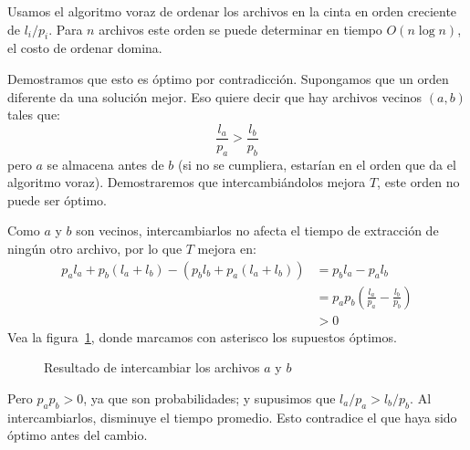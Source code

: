   Usamos el algoritmo voraz de ordenar los archivos en la cinta
  en orden creciente de \(l_i / p_i\).
  Para \(n\) archivos
  este orden se puede determinar en tiempo \(O(n \log n)\),
  el costo de ordenar domina.

  Demostramos que esto es óptimo por contradicción.
  Supongamos que un orden diferente da una solución mejor.
  Eso quiere decir que hay archivos vecinos \((a, b)\)
  tales que:
  \begin{equation*}
    \frac{l_a}{p_a}
      > \frac{l_b}{p_b}
  \end{equation*}
  pero \(a\) se almacena antes de \(b\)
  (si no se cumpliera,
   estarían en el orden que da el algoritmo voraz).
  Demostraremos que intercambiándolos mejora \(T\),
  este orden no puede ser óptimo.

  Como \(a\) y \(b\) son vecinos,
  intercambiarlos no afecta el tiempo de extracción de ningún otro archivo,
  por lo que \(T\) mejora en:
  \begin{align*}
    p_a l_a + p_b (l_a + l_b)
      - (p_b l_b + p_a (l_a + l_b))
      &= p_b l_a - p_a l_b \\
      &= p_a p_b \left( \frac{l_a}{p_a} - \frac{l_b}{p_b} \right) \\
      &> 0
  \end{align*}
  Vea la figura~\ref{fig:file-reordering},
  donde marcamos con asterisco los supuestos óptimos.
  \begin{figure}[ht]
    \centering
    \caption{Resultado de intercambiar los archivos \(a\) y \(b\)}
    \label{fig:file-reordering}
  \end{figure}
  Pero \(p_a p_b > 0\),
  ya que son probabilidades;
  y supusimos que \(l_a / p_a > l_b / p_b\).
  Al intercambiarlos,
  disminuye el tiempo promedio.
  Esto contradice el que haya sido óptimo antes del cambio.

